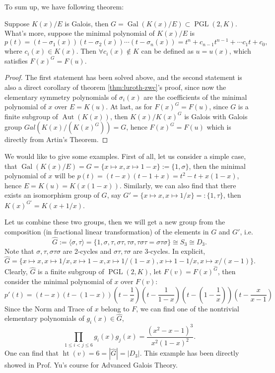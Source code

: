 To sum up, we have following theorem:
\begin{theorem}
Suppose $K(x)/E$ is Galois, then $G=\operatorname{Gal}(K(x)/E)\subset\operatorname{PGL}(2,K)$. What's more, suppose the minimal polynomial of $K(x)/E$ is $$p(t)=(t-\sigma_1(x))(t-\sigma_2(x))\cdots(t-\sigma_n(x))=t^n+c_{n-1}t^{n-1}+\cdots c_1t+c_0,$$ where $c_i(x)\in K(x)$. Then $\forall c_i(x)\not\in K$ can be defined as $u=u(x)$, which satisfies $F(x)^G=F(u)$.
\begin{proof}
The first statement has been solved above, and the second statement is also a direct corollary of theorem \ref{thm:luroth-zwc}'s proof, since now the elementary symmetry polynomials of $\sigma_i(x)$ are the coefficients of the minimal polynomial of $x$ over $E=K(u)$.  At last, as for $F(x)^G=F(u)$, since $G$ is  a finite subgroup of $\operatorname{Aut}(K(x))$, then $K(x)/K(x)^G$ is Galois with Galois group $Gal(K(x)/(K(x)^G))=G$, hence $F(x)^G=F(u)$ which is directly from Artin's Theorem.
\end{proof}
\end{theorem}

We would like to give some examples. First of all, let us consider a simple case, that $\operatorname{Gal}(K(x)/E)=G=\{x\mapsto x,x\mapsto 1-x\}:=\{1,\sigma\}$, then the minimal polynomial of $x$ will be $p(t)=(t-x)(t-1+x)=t^2-t+x(1-x)$, hence $E=K(u)=K(x(1-x))$. Similarly, we can also find that there exists an isomorphism group of $G$, say $G'=\{x\mapsto x,x\mapsto 1/x\}=:\{1,\tau\}$, then $K(x)^{G'}=K(x+1/x)$.

Let us combine these two groups, then we will get a new group from the composition (in fractional linear transformation) of the elements in $G$ and $G'$, i.e. $$\hat{G}:=\langle\sigma,\tau\rangle=\{1,\sigma,\tau,\sigma\tau,\tau\sigma,\tau\sigma\tau=\sigma\tau\sigma\}\cong S_3\cong D_3.$$ Note that $\sigma,\tau,\sigma\tau\sigma$ are 2-cycles and $\sigma\tau,\tau\sigma$ are 3-cycles. In explicit, $$\hat{G}=\{x\mapsto x,x\mapsto 1/x,x\mapsto 1-x,x\mapsto 1/(1-x),x\mapsto 1-1/x,x\mapsto x/(x-1)\}.$$
Clearly, $\hat{G}$ is a finite subgroup of $\operatorname{PGL}(2,K)$, let $F(v)=F(x)^{\hat{G}}$, then consider the minimal polynomial of $x$ over $F(v)$:
$$p'(t)=(t-x)(t-(1-x))\left(t-\frac{1}{x}\right)\left(t-\frac{1}{1-x}\right)\left(t-\left(1-\frac{1}{x}\right)\right)\left(t-\frac{x}{x-1}\right)$$
Since the Norm and Trace of $x$ belong to $F$, we can find one of the nontrivial elementary polynomials of $g_i(x)\in\hat{G}$, $$\prod_{1\leq i< j\leq 6}g_i(x)g_j(x)=\frac{(x^2-x-1)^3}{x^2(1-x)^2}.$$ One can find that $\operatorname{ht}(v)=6=|\hat{G}|=|D_3|$. This example has been directly showed in Prof. Yu's course for Advanced Galois Theory.

